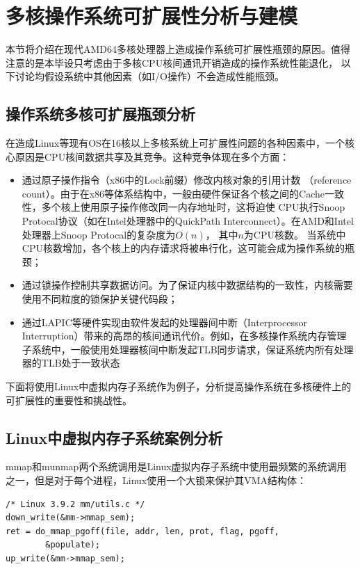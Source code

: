 
\chapter{多核操作系统可扩展性分析与建模}

本节将介绍在现代AMD64多核处理器上造成操作系统可扩展性瓶颈的原因。值得注意的是本毕设只考虑由于多核CPU核间通讯开销造成的操作系统性能退化，
以下讨论均假设系统中其他因素（如I/O操作）不会造成性能瓶颈。

\section{操作系统多核可扩展瓶颈分析}

在造成Linux等现有OS在16核以上多核系统上可扩展性问题的各种因素中，一个核心原因是CPU核间数据共享及其竞争。这种竞争体现在多个方面：

\begin{itemize}
\item 通过原子操作指令（x86中的Lock前缀）修改内核对象的引用计数
（reference count）。由于在x86等体系结构中，一般由硬件保证各个核之间的Cache一致性，多个核上使用原子操作修改同一内存地址时，这将迫使
CPU执行Snoop Protocal协议（如在Intel处理器中的QuickPath Interconnect）。在AMD和Intel处理器上Snoop Protocal的复杂度为$O(n)$\cite{intelquickpath}，
其中$n$为CPU核数。
当系统中CPU核数增加，各个核上的内存请求将被串行化，这可能会成为操作系统的瓶颈；
\item 通过锁操作控制共享数据访问。为了保证内核中数据结构的一致性，内核需要使用不同粒度的锁保护关键代码段；
\item 通过LAPIC等硬件实现由软件发起的处理器间中断（Interprocessor Interruption）带来的高昂的核间通讯代价。例如，在多核操作系统内存管理子系统中，一般使用处理器核间中断发起TLB同步请求，保证系统内所有处理器的TLB处于一致状态
\end{itemize}

下面将使用Linux中虚拟内存子系统作为例子，分析提高操作系统在多核硬件上的可扩展性的重要性和挑战性。

\section{Linux中虚拟内存子系统案例分析}

mmap和munmap两个系统调用是Linux虚拟内存子系统中使用最频繁的系统调用之一，但是对于每个进程，Linux使用一个大锁来保护其VMA结构体：

\begin{lstlisting}
/* Linux 3.9.2 mm/utils.c */
down_write(&mm->mmap_sem);
ret = do_mmap_pgoff(file, addr, len, prot, flag, pgoff,
		&populate);
up_write(&mm->mmap_sem);
\end{lstlisting}

